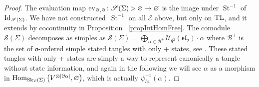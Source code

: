 \documentclass[pdftex]{sigma}%
\numberwithin{equation}{section}
\newcommand{\abss}[1]{\left\vert #1 \right\vert}
\newcommand{\St}{\operatorname{St}}
\newcommand{\Hom}{\operatorname{Hom}}
\newcommand{\Uq}{\mathcal{U}_{q^2}(\mathfrak{sl}_2)}
\begin{document}
\begin{proof}
The evaluation map ${\rm ev}_{\varnothing,\varnothing}\colon \mathscr{S}(\Sigma)\rhd \varnothing\to\varnothing$ is the image under $\St^{-1}$ of ${\rm Id}_{\mathscr{S}(\Sigma)}$. We have not constructed~$\St^{-1}$ on all $\mathcal{E}$ above, but only on ${\rm TL}$, and it extends by cocontinuity in Proposition~ \ref{propIntHomFree}. The comodule~$\mathscr{S}(\Sigma)$ decomposes as simples as $\mathscr{S}(\Sigma) = \bigoplus_{\alpha \in \mathcal{B}^+} \Uq\cdot \alpha$ where $\mathcal{B}^+$ is the set of $\mathfrak{o}$-ordered simple stated tangles with only + states, see \cite[Theorem~4.6(b)]{Cos}. These stated tangles with only + states are simply a way to represent canonically a tangle without state information, and again in the following we will see $\alpha$ as a morphism in $\Hom_{{\rm Sk}_\mathcal{V}(\Sigma)}\big(V^{\otimes \abss{\partial \alpha}},\varnothing\big)$, which is actually $\psi_{hv}^{-1}(\alpha)$.


\end{proof}
\end{document}
